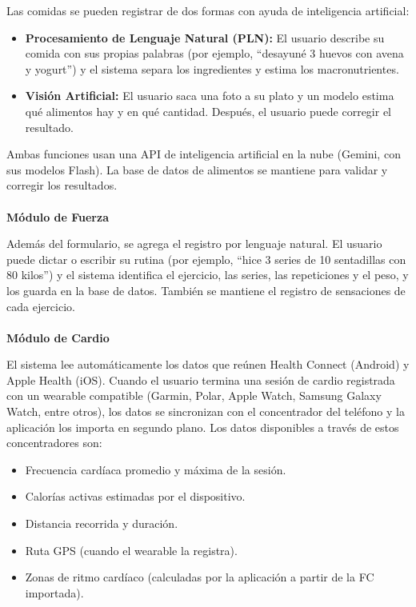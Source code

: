 Las comidas se pueden registrar de dos formas con ayuda de inteligencia artificial:
\begin{itemize}
    \item \textbf{Procesamiento de Lenguaje Natural (PLN):} El usuario describe su comida con sus propias palabras (por ejemplo, ``desayuné 3 huevos con avena y yogurt'') y el sistema separa los ingredientes y estima los macronutrientes.
    \item \textbf{Visión Artificial:} El usuario saca una foto a su plato y un modelo estima qué alimentos hay y en qué cantidad. Después, el usuario puede corregir el resultado.
\end{itemize}
Ambas funciones usan una API de inteligencia artificial en la nube (Gemini, con sus modelos Flash). La base de datos de alimentos se mantiene para validar y corregir los resultados.
\\\\
\textbf{Módulo de Fuerza}

Además del formulario, se agrega el registro por lenguaje natural. El usuario puede dictar o escribir su rutina (por ejemplo, ``hice 3 series de 10 sentadillas con 80 kilos'') y el sistema identifica el ejercicio, las series, las repeticiones y el peso, y los guarda en la base de datos. También se mantiene el registro de sensaciones de cada ejercicio.
\\\\
\textbf{Módulo de Cardio}

El sistema lee automáticamente los datos que reúnen Health Connect (Android) y Apple Health (iOS). Cuando el usuario termina una sesión de cardio registrada con un wearable compatible (Garmin, Polar, Apple Watch, Samsung Galaxy Watch, entre otros), los datos se sincronizan con el concentrador del teléfono y la aplicación los importa en segundo plano. Los datos disponibles a través de estos concentradores son:

\begin{itemize}
    \item Frecuencia cardíaca promedio y máxima de la sesión.
    \item Calorías activas estimadas por el dispositivo.
    \item Distancia recorrida y duración.
    \item Ruta GPS (cuando el wearable la registra).
    \item Zonas de ritmo cardíaco (calculadas por la aplicación a partir de la FC importada).
\end{itemize}

